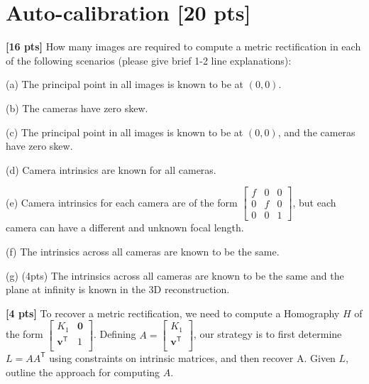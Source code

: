 \documentclass[11pt,addpoints,answers]{exam}
\numberwithin{equation}{section} %
\numberwithin{figure}{section} %
\numberwithin{table}{section} %
\begin{document}
\section{Auto-calibration [20 pts]}
\begin{questions}

\question \textbf{[16 pts]} How many images are required to compute a metric rectification in each of the following scenarios (please give brief 1-2 line explanations):

(a) The principal point in all images is known to be at $(0,0)$.

(b) The cameras have zero skew.

(c) The principal point in all images is known to be at $(0,0)$, and the cameras have zero skew.

(d)  Camera intrinsics are known for all cameras.

(e) Camera intrinsics for each camera are of the form
$
\begin{bmatrix}
f & 0 & 0 \\
0 & f & 0 \\
0 & 0 & 1
\end{bmatrix}$, but each camera can have a different and unknown focal length.

(f) The intrinsics across all cameras are known to be the same.

(g) (4pts) The intrinsics across all cameras are known to be the same and the plane at infinity is known in the 3D reconstruction.

\begin{tcolorbox}[fit,height=14cm, width=\textwidth, blank, borderline={0.5pt}{-2pt},halign=left, valign=center, nobeforeafter]

\end{tcolorbox}

\newpage

\question \textbf{[4 pts]} To recover a metric rectification, we need to compute a Homography $H$ of the form $\begin{bmatrix}
K_1 & \mathbf{0} \\
\mathbf{v}^{\mathsf{T}} & 1 \\
\end{bmatrix}$. Defining $A=\begin{bmatrix}
K_1 \\
\mathbf{v}^{\mathsf{T}} \\
\end{bmatrix}$, our strategy is to first determine $L=AA^{\mathsf{T}}$ using constraints on intrinsic matrices, and then recover A. Given $L$, outline the approach for computing $A$.


\end{questions}
\end{document}
